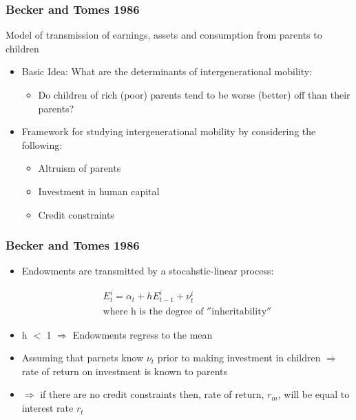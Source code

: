 \documentclass{beamer}
\begin{document}




\begin{frame}
\frametitle{Becker and Tomes 1986}
Model of transmission of earnings, assets and consumption from parents to children 

\begin{itemize}
\item Basic Idea: What are the determinants of intergenerational mobility:
\begin{itemize}
\item Do children of rich (poor) parents tend to be worse (better) off than their parents? 
\end{itemize}

\item Framework for studying intergenerational mobility by considering the following:
\begin{itemize}
\item Altruism of parents 
\item Investment in human capital
\item Credit constraints

\end{itemize}
\end{itemize}
\end{frame}


\begin{frame}
\frametitle{Becker and Tomes 1986}
\begin{itemize}

\item Endowments are transmitted by a stocahstic-linear process:

\begin{align*}
E^i_{t} = \alpha_{t} + h E^i_{t-1} + \nu^i_{t}  \\
\text{where h is the degree of $''$inheritability$''$} 
\end{align*}

\item h $<$ 1 $\Rightarrow$  Endowments regress to the mean

\item Assuming that parnets know $\nu_{t}$ prior to making investment in children $\Rightarrow$ rate of return on investment is known to parents 

\item $\Rightarrow$ if there are no credit constraints then, rate of return, $r_{m}$, will be equal to interest rate $r_{t}$ 
\end{itemize}
\end{frame}
\end{document}
